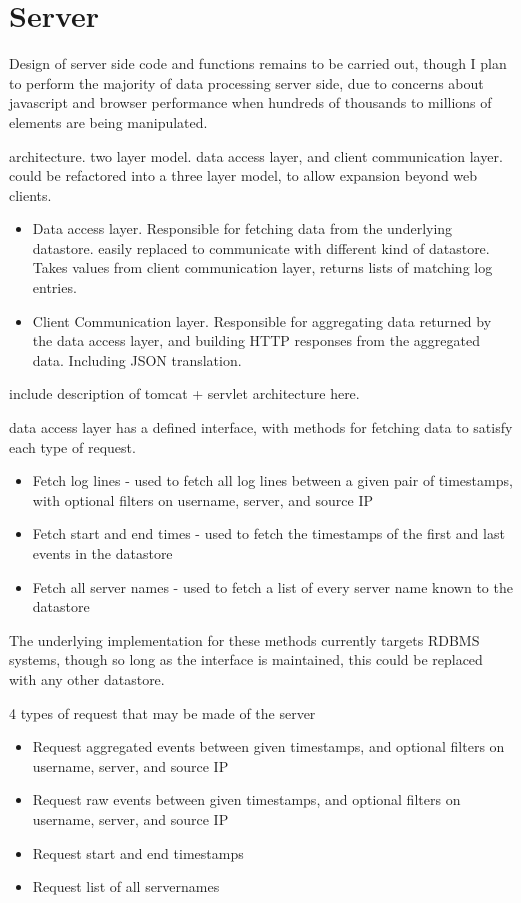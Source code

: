 \section{Server}

Design of server side code and functions remains to be carried out, though I plan to perform the majority of data processing server side, due to concerns about javascript and browser performance when hundreds of thousands to millions of elements are being manipulated. 

architecture. two layer model. data access layer, and client communication layer. 
could be refactored into a three layer model, to allow expansion beyond web clients. 
\begin{itemize}
\item{Data access layer. Responsible for fetching data from the underlying datastore. easily replaced to communicate with different kind of datastore. Takes values from client communication layer, returns lists of matching log entries.}
\item{Client Communication layer. Responsible for aggregating data returned by the data access layer, and building HTTP responses from the aggregated data. Including JSON translation.}
\end{itemize}
\<include description of tomcat + servlet architecture here.\>

data access layer has a defined interface, with methods for fetching data to satisfy each type of request.
\begin{itemize}
\item{Fetch log lines - used to fetch all log lines between a given pair of timestamps, with optional filters on username, server, and source IP}
\item{Fetch start and end times - used to fetch the timestamps of the first and last events in the datastore}
\item{Fetch all server names - used to fetch a list of every server name known to the datastore}
\end{itemize}

The underlying implementation for these methods currently targets RDBMS systems, though so long as the interface is maintained, this could be replaced with any other datastore.

4 types of request that may be made of the server
\begin{itemize}
\item{Request aggregated events between given timestamps, and optional filters on username, server, and source IP}
\item{Request raw events between given timestamps, and optional filters on username, server, and source IP}
\item{Request start and end timestamps}
\item{Request list of all servernames}
\end{itemize}

